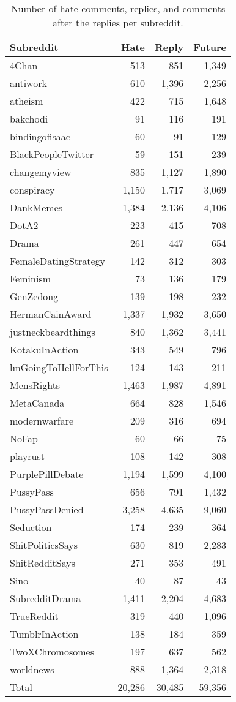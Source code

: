 \documentclass[11pt]{article}
\begin{document}
\begin{table}[ht!]
	\centering
	\small
	\begin{tabular}{lrrr}
		\toprule
		Subreddit & Hate  & Reply & Future\\
		\midrule
		4Chan	 & 513 &	851	&1,349\\
		antiwork &	610	&1,396	&2,256\\	
		atheism	&422	&715	&1,648
		\\
		bakchodi	&91	&116	&191
		\\
		bindingofisaac	&60	&91	&129
		\\
		BlackPeopleTwitter	&59	&151	&239
		\\
		changemyview	&835	&1,127&	1,890
		\\
		conspiracy&	1,150&	1,717&	3,069
		\\
		DankMemes&	1,384&	2,136&	4,106
		\\
		DotA2&	223&	415&	708
		\\
		Drama&	261	&447	&654
		\\
		FemaleDatingStrategy&	142	&312&	303
		\\
		Feminism&	73&	136	&179
		\\
		GenZedong&	139&	198	&232
		\\
		HermanCainAward&	1,337&	1,932&	3,650
		\\
		justneckbeardthings&	840&	1,362&	3,441
		\\
		KotakuInAction&	343	&549	&796
		\\
		lmGoingToHellForThis&	124	&143&	211
		\\
		MensRights&	1,463&	1,987&	4,891
		\\
		MetaCanada	&664&	828	&1,546
		\\
		modernwarfare&	209	&316	&694
		\\
		NoFap&	60	&66&	75
		\\
		playrust	&108&	142	&308
		\\
		PurplePillDebate&	1,194&	1,599&	4,100
		\\
		PussyPass&	656&	791&	1,432
		\\
		PussyPassDenied	&3,258&	4,635&	9,060
		\\
		Seduction&	174	&239&	364
		\\
		ShitPoliticsSays&	630	&819	&2,283
		\\
		ShitRedditSays	&271&	353&	491
		\\
		Sino&	40&	87&	43
		\\
		SubredditDrama&	1,411&	2,204&	4,683
		\\
		TrueReddit	&319	&440&	1,096
		\\
		TumblrInAction&	138&	184&	359
		\\
		TwoXChromosomes	&197	&637&	562
		\\
		worldnews	&888&	1,364&	2,318\\
		\midrule
		Total & 20,286 & 30,485 & 59,356 \\
		\bottomrule
		
	\end{tabular}
	\caption{Number of hate comments, replies, and comments after the replies per subreddit.}
	\label{t:subreddits}
\end{table}
\end{document}
